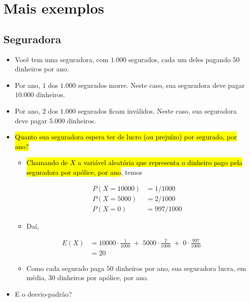 \documentclass[
  11pt]{report}
\providecommand{\tightlist}{%
  \setlength{\itemsep}{0pt}\setlength{\parskip}{0pt}}
\begin{document}
\hypertarget{mais-exemplos}{%
\section{Mais exemplos}\label{mais-exemplos}}

\hypertarget{seguradora}{%
\subsection{Seguradora}\label{seguradora}}

\begin{itemize}
\item
  Você tem uma seguradora, com $1.000$ segurados, cada um deles pagando $50$ dinheiros por ano.
\item
  Por ano, $1$ dos $1.000$ segurados morre. Neste caso, sua seguradora deve pagar $10.000$ dinheiros.
\item
  Por ano, $2$ dos $1.000$ segurados ficam inválidos. Neste caso, sua seguradora deve pagar $5.000$ dinheiros.
\item
  {\hl{Quanto sua seguradora espera ter de lucro (ou prejuízo) por segurado, por ano?}}

  \begin{itemize}
  \item
    {\hl{Chamando de $X$ a variável aleatória que representa o dinheiro pago pela seguradora por apólice, por ano}}, temos

    \[
    \begin{aligned}
    P(X = 10000) &= 1/1000\\
    P(X = 5000)  &= 2/1000\\
    P(X = 0)     &= 997/1000
    \end{aligned}
    \]
  \item
    Daí,
  \end{itemize}

  \[
   \begin{aligned}
   E(X) &= 10000 \cdot \frac{1}{1000} \;+\; 5000 \cdot \frac{2}{1000} \;+\; 0 \cdot \frac{997}{1000} \\
        &= 20
   \end{aligned}
   \]

  \begin{itemize}
  \tightlist
  \item
    Como cada segurado paga $50$ dinheiros por ano, sua seguradora lucra, em média, $30$ dinheiros por apólice, por ano.
  \end{itemize}
\item
  E o desvio-padrão?


\end{itemize}
\end{document}
